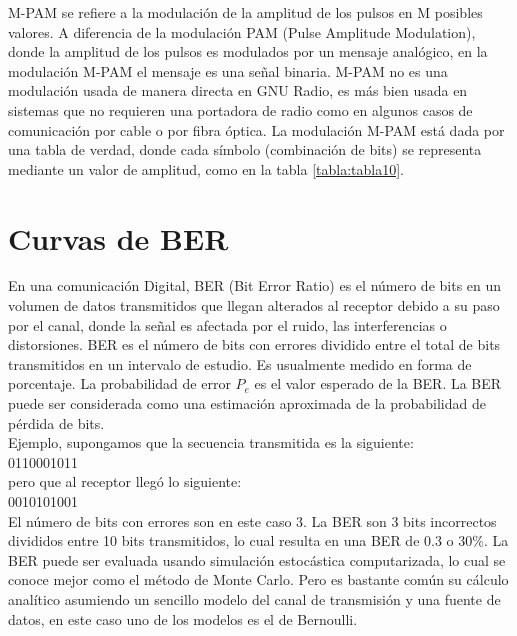 M-PAM se refiere a la modulación de la amplitud de los pulsos en M posibles valores. A diferencia de la modulación PAM (Pulse Amplitude Modulation), donde la amplitud de los pulsos es modulados por un mensaje analógico, en la modulación M-PAM el mensaje es una señal binaria. M-PAM no es una modulación usada de manera directa en GNU Radio, es más bien usada en sistemas que no requieren una portadora de radio como en algunos casos de comunicación por cable o por fibra óptica. 
La modulación M-PAM está dada por una tabla de verdad, donde cada símbolo (combinación de bits) se representa mediante un valor de amplitud, como en la tabla \ref{tabla:tabla10}. \\


\section{Curvas de BER}
En una comunicación Digital, BER (Bit Error Ratio) es el número de bits en un volumen de datos transmitidos que llegan alterados al receptor debido a su paso por el canal, donde la señal es afectada por el ruido, las interferencias o distorsiones. BER es el número de bits con errores dividido entre el total de bits transmitidos en un intervalo de estudio. Es usualmente medido en forma de porcentaje. La probabilidad de error $P_e$ es el valor esperado de la BER.  La BER puede ser considerada como una estimación aproximada de la probabilidad de pérdida de bits. \\

Ejemplo, supongamos que la secuencia transmitida es la siguiente: \\

0110001011 \\

pero que al receptor llegó lo siguiente: \\

0010101001 \\

El número de bits con errores son en este caso 3. La BER son 3 bits incorrectos divididos entre 10 bits transmitidos, lo cual resulta en una BER de 0.3 o 30$\%$.
La BER puede ser evaluada usando simulación estocástica computarizada, lo cual se conoce mejor como el método de Monte Carlo. Pero es bastante común su cálculo analítico asumiendo un sencillo modelo del canal de transmisión y una fuente de datos, en este caso uno de los modelos es el de Bernoulli. \\

